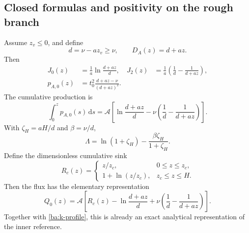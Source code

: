 \documentclass[11pt,a4paper]{article}
\numberwithin{equation}{section}
\begin{document}
\subsection{Closed formulas and positivity on the rough branch}
\label{ba:rough}

Assume $z_v\leq0$, and define
\begin{equation}
 d=\nu-az_v\geq\nu,
 \qquad D_A(z)=d+az.
 \label{ba:rough-D}
\end{equation}
Then
\begin{equation}
 \begin{aligned}
 J_0(z)&=\frac1a\ln\frac{d+az}{d},&
 J_2(z)&=\frac1a\left(\frac1d-\frac1{d+az}\right),\\
 p_{A,0}(z)&=t_0^2\frac{d+az-\nu}{(d+az)^2}.&&
 \end{aligned}
 \label{ba:rough-integrals}
\end{equation}
The cumulative production is
\begin{equation}
 \int_0^zp_{A,0}(s)\,\mathrm ds
 =\mathcal A\left[
 \ln\frac{d+az}{d}
 -\nu\left(\frac1d-\frac1{d+az}\right)\right].
 \label{ba:rough-production}
\end{equation}
With $\zeta_H=aH/d$ and $\beta=\nu/d$,
\begin{equation}
 \Lambda=\ln(1+\zeta_H)-\frac{\beta\zeta_H}{1+\zeta_H}.
 \label{ba:rough-Lambda}
\end{equation}
Define the dimensionless cumulative sink
\begin{equation}
 R_c(z)=\begin{cases}
 z/z_c,&0\leq z\leq z_c,\\
 1+\ln(z/z_c),&z_c\leq z\leq H.
 \end{cases}
 \label{ba:Rc}
\end{equation}
Then the flux has the elementary representation
\begin{equation}
 \boxed{Q_0(z)=\mathcal A\left[
 R_c(z)-\ln\frac{d+az}{d}
 +\nu\left(\frac1d-\frac1{d+az}\right)\right].}
 \label{ba:rough-Q}
\end{equation}
Together with \eqref{ba:k-profile}, this is already an exact analytical
representation of the inner reference.
\end{document}
